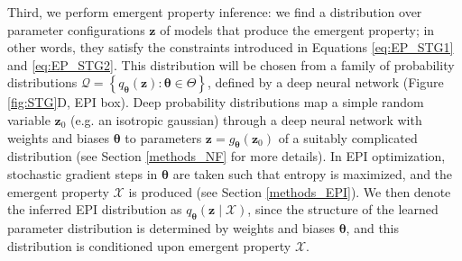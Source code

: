 \documentclass[11pt]{article}
\begin{document}
Third, we perform emergent property inference: we find a distribution over parameter configurations $\mathbf{z}$ of models that produce the emergent property; in other words, they satisfy the constraints introduced in Equations \ref{eq:EP_STG1} and \ref{eq:EP_STG2}.  
This distribution will be chosen from a family of probability distributions $\mathcal{Q} = \left\{ q_{\bm{\theta}}(\mathbf{z}) : \bm{\theta} \in \Theta \right\}$, defined by a deep neural network \cite{rezende2015variational, papamakarios2019normalizing} (Figure \ref{fig:STG}D, EPI box).
Deep probability distributions map a simple random variable $\mathbf{z}_0$ (e.g. an isotropic gaussian) through a deep neural network with weights and biases $\bm{\theta}$ to parameters $\mathbf{z} = g_{\bm{\theta}}(\mathbf{z}_0)$ of a suitably complicated distribution (see Section \ref{methods_NF} for more details).
In EPI optimization, stochastic gradient steps in $\bm{\theta}$ are taken such that entropy is maximized, and the emergent property $\mathcal{X}$ is produced (see Section \ref{methods_EPI}).
We then denote the inferred EPI distribution as $q_{\bm{\theta}}(\mathbf{z} \mid \mathcal{X})$, since the structure of the learned parameter distribution is determined by weights and biases $\bm{\theta}$, and this distribution is conditioned upon emergent property $\mathcal{X}$.
\end{document}
